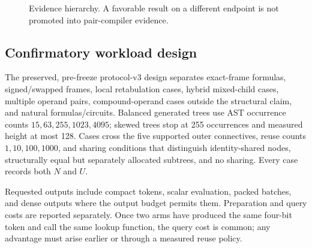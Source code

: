 \documentclass[10pt]{article}
\theoremstyle{plain}
\theoremstyle{definition}
\theoremstyle{remark}
\begin{document}
\begin{figure}[H]
\centering
{}
\caption{Evidence hierarchy. A favorable result on a different endpoint is not promoted into pair-compiler evidence.}
\label{fig:evidence-levels}
\end{figure}

\subsection{Confirmatory workload design}

The preserved, pre-freeze protocol-v3 design \cite{ProtocolV3} separates exact-frame formulas, signed/swapped frames, local retabulation cases, hybrid mixed-child cases, multiple operand pairs, compound-operand cases outside the structural claim, and natural formulas/circuits. Balanced generated trees use AST occurrence counts $15,63,255,1023,4095$; skewed trees stop at 255 occurrences and measured height at most 128. Cases cross the five supported outer connectives, reuse counts $1,10,100,1000$, and sharing conditions that distinguish identity-shared nodes, structurally equal but separately allocated subtrees, and no sharing. Every case records both $N$ and $U$.

Requested outputs include compact tokens, scalar evaluation, packed batches, and dense outputs where the output budget permits them. Preparation and query costs are reported separately. Once two arms have produced the same four-bit token and call the same lookup function, the query cost is common; any advantage must arise earlier or through a measured reuse policy.
\end{document}
